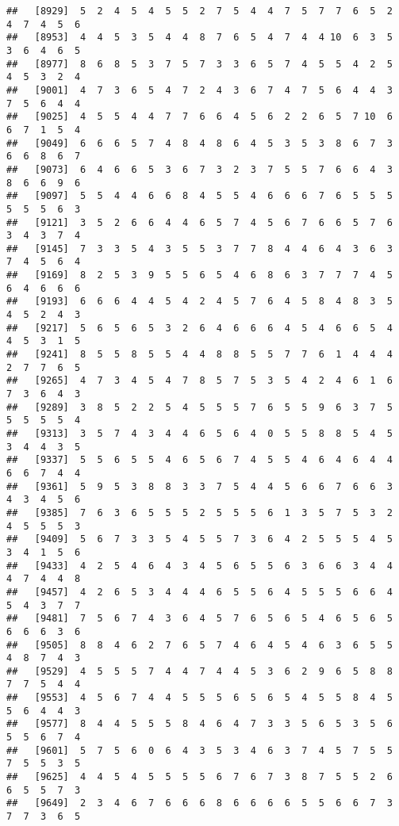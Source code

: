 \documentclass[
]{book}
\begin{document}
\begin{verbatim}
##   [8929]  5  2  4  5  4  5  5  2  7  5  4  4  7  5  7  7  6  5  2  4  7  4  5  6
##   [8953]  4  4  5  3  5  4  4  8  7  6  5  4  7  4  4 10  6  3  5  3  6  4  6  5
##   [8977]  8  6  8  5  3  7  5  7  3  3  6  5  7  4  5  5  4  2  5  4  5  3  2  4
##   [9001]  4  7  3  6  5  4  7  2  4  3  6  7  4  7  5  6  4  4  3  7  5  6  4  4
##   [9025]  4  5  5  4  4  7  7  6  6  4  5  6  2  2  6  5  7 10  6  6  7  1  5  4
##   [9049]  6  6  6  5  7  4  8  4  8  6  4  5  3  5  3  8  6  7  3  6  6  8  6  7
##   [9073]  6  4  6  6  5  3  6  7  3  2  3  7  5  5  7  6  6  4  3  8  6  6  9  6
##   [9097]  5  5  4  4  6  6  8  4  5  5  4  6  6  6  7  6  5  5  5  5  5  5  6  3
##   [9121]  3  5  2  6  6  4  4  6  5  7  4  5  6  7  6  6  5  7  6  3  4  3  7  4
##   [9145]  7  3  3  5  4  3  5  5  3  7  7  8  4  4  6  4  3  6  3  7  4  5  6  4
##   [9169]  8  2  5  3  9  5  5  6  5  4  6  8  6  3  7  7  7  4  5  6  4  6  6  6
##   [9193]  6  6  6  4  4  5  4  2  4  5  7  6  4  5  8  4  8  3  5  4  5  2  4  3
##   [9217]  5  6  5  6  5  3  2  6  4  6  6  6  4  5  4  6  6  5  4  4  5  3  1  5
##   [9241]  8  5  5  8  5  5  4  4  8  8  5  5  7  7  6  1  4  4  4  2  7  7  6  5
##   [9265]  4  7  3  4  5  4  7  8  5  7  5  3  5  4  2  4  6  1  6  7  3  6  4  3
##   [9289]  3  8  5  2  2  5  4  5  5  5  7  6  5  5  9  6  3  7  5  5  5  5  5  4
##   [9313]  3  5  7  4  3  4  4  6  5  6  4  0  5  5  8  8  5  4  5  3  4  4  3  5
##   [9337]  5  5  6  5  5  4  6  5  6  7  4  5  5  4  6  4  6  4  4  6  6  7  4  4
##   [9361]  5  9  5  3  8  8  3  3  7  5  4  4  5  6  6  7  6  6  3  4  3  4  5  6
##   [9385]  7  6  3  6  5  5  5  2  5  5  5  6  1  3  5  7  5  3  2  4  5  5  5  3
##   [9409]  5  6  7  3  3  5  4  5  5  7  3  6  4  2  5  5  5  4  5  3  4  1  5  6
##   [9433]  4  2  5  4  6  4  3  4  5  6  5  5  6  3  6  6  3  4  4  4  7  4  4  8
##   [9457]  4  2  6  5  3  4  4  4  6  5  5  6  4  5  5  5  6  6  4  5  4  3  7  7
##   [9481]  7  5  6  7  4  3  6  4  5  7  6  5  6  5  4  6  5  6  5  6  6  6  3  6
##   [9505]  8  8  4  6  2  7  6  5  7  4  6  4  5  4  6  3  6  5  5  4  8  7  4  3
##   [9529]  4  5  5  5  7  4  4  7  4  4  5  3  6  2  9  6  5  8  8  7  7  5  4  4
##   [9553]  4  5  6  7  4  4  5  5  5  6  5  6  5  4  5  5  8  4  5  5  6  4  4  3
##   [9577]  8  4  4  5  5  5  8  4  6  4  7  3  3  5  6  5  3  5  6  5  5  6  7  4
##   [9601]  5  7  5  6  0  6  4  3  5  3  4  6  3  7  4  5  7  5  5  7  5  5  3  5
##   [9625]  4  4  5  4  5  5  5  5  6  7  6  7  3  8  7  5  5  2  6  6  5  5  7  3
##   [9649]  2  3  4  6  7  6  6  6  8  6  6  6  6  5  5  6  6  7  3  7  7  3  6  5

\end{verbatim}
\end{document}
